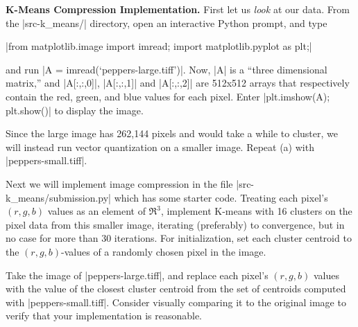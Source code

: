 \item {}
\textbf{K-Means Compression Implementation.}
First let us \emph{look} at our data. From the |src-k_means/| directory, open an interactive Python prompt, and type
%
\begin{center}
  |from matplotlib.image import imread; import matplotlib.pyplot as plt;|
\end{center}
%
and run |A = imread(`peppers-large.tiff')|. Now, |A| is a ``three dimensional matrix,'' and |A[:,:,0]|, |A[:,:,1]| and |A[:,:,2]| are 512x512 arrays that respectively contain the red, green, and blue values for each pixel. Enter |plt.imshow(A); plt.show()| to display the image.

Since the large image has 262,144 pixels and would take a while to cluster, we will instead run vector quantization on a smaller image. Repeat (a) with |peppers-small.tiff|.


Next we will implement image compression in the file |src-k_means/submission.py| which has some starter code. Treating each pixel's $(r, g, b)$ values as an element of $\Re^3$, implement K-means with 16 clusters on the pixel data from this smaller image, iterating (preferably) to convergence, but in no case for more than 30 iterations. For initialization, set each cluster centroid to the $(r, g, b)$-values of a randomly chosen pixel in the image.

Take the image of |peppers-large.tiff|, and replace each pixel's $(r, g, b)$ values with the value of the closest cluster centroid from the set of centroids computed with |peppers-small.tiff|. Consider visually comparing it to the original image to verify that your implementation is reasonable.
